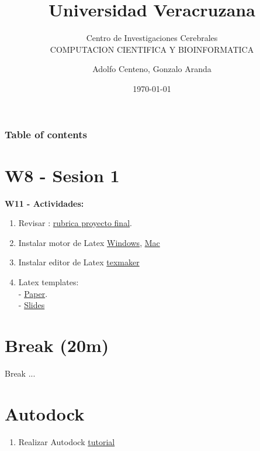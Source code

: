 \documentclass{beamer}
\begin{document}
\title{Universidad Veracruzana}  
\subtitle{Centro de Investigaciones Cerebrales\\COMPUTACION CIENTIFICA Y BIOINFORMATICA}
\author{Adolfo Centeno, Gonzalo Aranda}
\date{\today} 


\begin{frame}
\titlepage
\end{frame}

\begin{frame}\frametitle{Table of contents}
\tableofcontents
\end{frame} 


\section{W8 - Sesion 1 }

\begin{frame}

\textbf{W11 - Actividades:}

\begin{enumerate}

\item
	Revisar : \href{https://github.com/adsoftsito/python/blob/master/w11/rubricaBioinformatica.txt}{rubrica proyecto final}.	

\item Instalar  motor de Latex \href{https://miktex.org/download} {Windows}, \href {http://www.tug.org/mactex/mactex-download.html} {Mac}

\item Instalar editor de Latex \href{https://www.xm1math.net/texmaker/download.html}{texmaker}


\item
    Latex templates:  \\
    - \href{https://github.com/adsoftsito/python/blob/master/w11/simplepaper.tex}{Paper}. \\
    - \href{https://github.com/adsoftsito/python/blob/master/w11/slides_python_w11.tex}{Slides} 

	

\end{enumerate} 

\end{frame}


\section{Break  (20m) }

\begin{frame}


Break ...

\end{frame}




\section{Autodock }

\begin{frame}

\begin{enumerate}

\item  Realizar Autodock \href{https://github.com/adsoftsito/python/blob/master/w11/autodock/UsingAutoDockWithADT.pdf}{tutorial}   
\end{enumerate} 


\end{frame}
\end{document}
